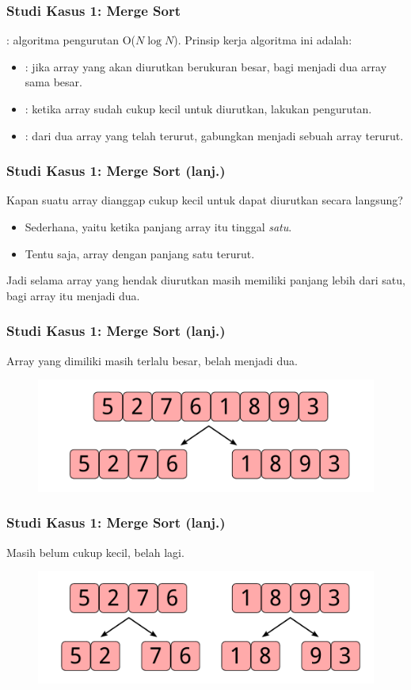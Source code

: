 \begin{frame}
\frametitle{Studi Kasus 1: Merge Sort}
: algoritma pengurutan O($N \log{N}$).
\newline
\newline
Prinsip kerja algoritma ini adalah:
\begin{itemize}
  \item {}: jika array yang akan diurutkan berukuran besar, bagi menjadi dua array sama besar.
  \item {}: ketika array sudah cukup kecil untuk diurutkan, lakukan pengurutan.
  \item {}: dari dua array yang telah terurut, gabungkan menjadi sebuah array terurut.
\end{itemize}
\end{frame}

\begin{frame}
\frametitle{Studi Kasus 1: Merge Sort (lanj.)}
Kapan suatu array dianggap cukup kecil untuk dapat diurutkan secara langsung?
\newline
\begin{itemize}
  \item Sederhana, yaitu ketika panjang array itu tinggal \emph{satu}.
  \item Tentu saja, array dengan panjang satu  terurut.
  \newline
\end{itemize}
Jadi selama array yang hendak diurutkan masih memiliki panjang lebih dari satu, bagi array itu menjadi dua.
\end{frame}

\begin{frame}
\frametitle{Studi Kasus 1: Merge Sort (lanj.)}
Array yang dimiliki masih terlalu besar, belah menjadi dua.
\begin{figure}
  \centering
  \includegraphics[width=10 cm]{asset/merge-sort-demo-1.pdf}
\end{figure}
\end{frame}

\begin{frame}
\frametitle{Studi Kasus 1: Merge Sort (lanj.)}
Masih belum cukup kecil, belah lagi.
\begin{figure}
  \centering
  \includegraphics[width=10 cm]{asset/merge-sort-demo-2.pdf}
\end{figure}
\end{frame}

